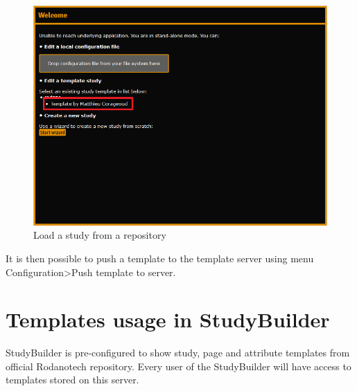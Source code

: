 \documentclass[11pt,a4paper,oneside]{article}
\begin{document}
\begin{figure}[h]
\caption{Load a study from a repository}
\includegraphics[width=\linewidth]{node_templates_load_study}
\end{figure}

It is then possible to push a template to the template server using menu Configuration\textgreater Push template to server.

\section{Templates usage in StudyBuilder}
StudyBuilder is pre-configured to show study, page and attribute templates from official Rodanotech repository. Every user of the StudyBuilder will have access to templates stored on this server.
\end{document}
